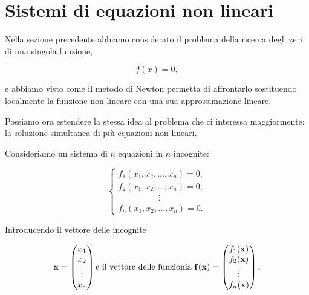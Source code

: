 \section{Sistemi di equazioni non lineari}
\label{sec:sistemi-nonlineari}

Nella sezione precedente abbiamo considerato il problema della ricerca
degli zeri di una singola funzione,

\begin{equation*}
    f(x)=0,
\end{equation*}

e abbiamo visto come il metodo di Newton permetta di affrontarlo
sostituendo localmente la funzione non lineare con una sua
approssimazione lineare.

Possiamo ora estendere la stessa idea al problema che ci interessa
maggiormente: la soluzione simultanea di più equazioni non lineari.

Consideriamo un sistema di $n$ equazioni in $n$ incognite:

\begin{equation*}
\begin{cases}
f_1(x_1,x_2,\ldots,x_n)=0,\\
f_2(x_1,x_2,\ldots,x_n)=0,\\
\hspace{2cm}\vdots\\
f_n(x_1,x_2,\ldots,x_n)=0.
\end{cases}
\label{eq:nonlinear-system}
\end{equation*}

Introducendo il vettore delle incognite

\begin{equation*}
    \mathbf{x}
    =
    \begin{pmatrix}
        x_1\\
        x_2\\
        \vdots\\
        x_n
    \end{pmatrix}
    \textnormal{e il vettore delle funzionia}\
    \mathbf{f}(\mathbf{x})
    =
    \begin{pmatrix}
        f_1(\mathbf{x})\\
        f_2(\mathbf{x})\\
        \vdots\\
        f_n(\mathbf{x})
    \end{pmatrix},
\end{equation*}

